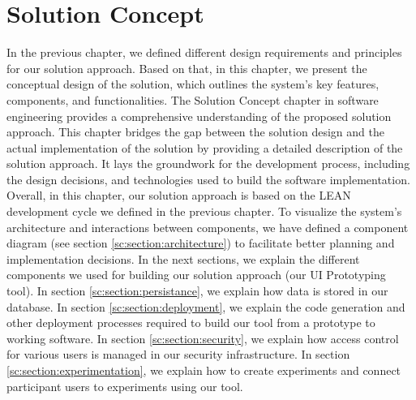 
\chapter{Solution Concept}

\ifpdf
    \graphicspath{{Chapters/Solution-Concept/Figs/}{Chapters/Solution-Concept/Figs/}{Chapters/Solution-Concept/Figs/}}
\else
    \graphicspath{{Chapters/Solution-Concept/Figs/}{Chapters/Solution-Concept/Figs/}}
\fi
In the previous chapter, we defined different design requirements and principles for our solution approach. 
Based on that, in this chapter, we present the conceptual design of the solution, which outlines the system's key features, components, and functionalities. 
The Solution Concept chapter in software engineering provides a comprehensive understanding of the proposed solution approach. 
This chapter bridges the gap between the solution design and the actual implementation of the solution by providing a detailed description of the solution approach. 
It lays the groundwork for the development process, including the design decisions, and technologies used to build the software implementation. 
Overall, in this chapter, our solution approach is based on the LEAN development cycle we defined in the previous chapter.
To visualize the system's architecture and interactions between components, we have defined a component diagram (see section \ref{sc:section:architecture}) to facilitate better planning and implementation decisions.
In the next sections, we explain the different components we used for building our solution approach (our UI Prototyping tool). 
In section \ref{sc:section:persistance}, we explain how data is stored in our database. 
In section \ref{sc:section:deployment}, we explain the code generation and other deployment processes required to build our tool from a prototype to working software.
In section \ref{sc:section:security}, we explain how access control for various users is managed in our security infrastructure. 
In section \ref{sc:section:experimentation}, we explain how to create experiments and connect participant users to experiments using our tool. 

